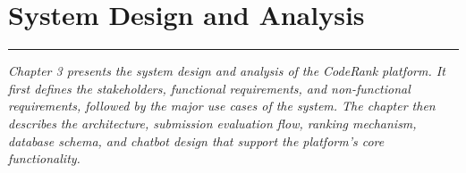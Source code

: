 \chapter {System Design and Analysis}
\noindent
\rule{\textwidth}{0.4pt}

\begin{center}
\begin{minipage}{0.8\textwidth}
\textit{Chapter 3 presents the system design and analysis of the CodeRank platform. It first defines the stakeholders, functional requirements, and non-functional requirements, followed by the major use cases of the system. The chapter then describes the architecture, submission evaluation flow, ranking mechanism, database schema, and chatbot design that support the platform's core functionality.}
\end{minipage}

\end{center}









\clearpage
